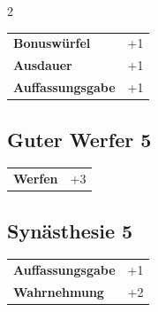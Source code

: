 \begin{multicols}{2}
\begin{tcolorbox}
\vspace{3mm}

\begin{tabular}{@{}ll@{}}
    \textbf{Bonuswürfel} & +1\\
    \textbf{Ausdauer} & +1\\
    \textbf{Auffassungsgabe} & +1\\
\end{tabular}


\end{tcolorbox}

\begin{tcolorbox}
    \subsection*{Guter Werfer \hfill \small{5 }}
    \tcblower




\begin{tabular}{@{}ll@{}}
    \textbf{Werfen} & +3\\
\end{tabular}


\end{tcolorbox}

\begin{tcolorbox}
    \subsection*{Synästhesie \hfill \small{5 }}
    \tcblower




\begin{tabular}{@{}ll@{}}
    \textbf{Auffassungsgabe} & +1\\
    \textbf{Wahrnehmung} & +2\\
\end{tabular}


\end{tcolorbox}


\end{multicols}
